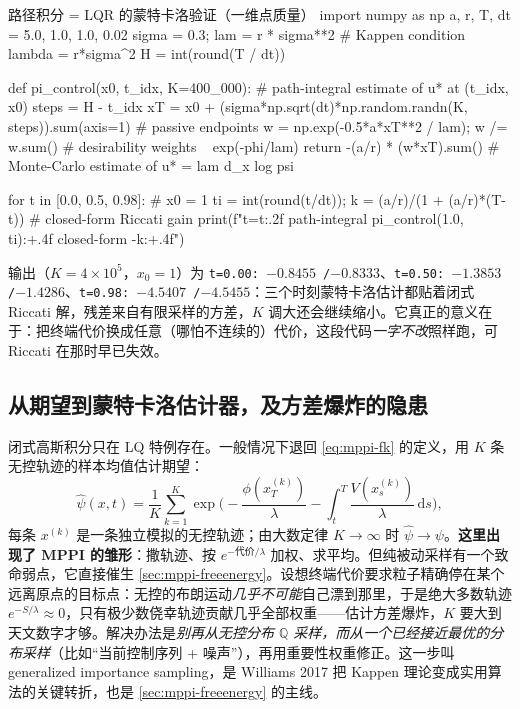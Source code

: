 \begin{codebox}[Python]{路径积分 = LQR 的蒙特卡洛验证（一维点质量）}
import numpy as np
a, r, T, dt = 5.0, 1.0, 1.0, 0.02
sigma = 0.3; lam = r * sigma**2              # Kappen condition  lambda = r*sigma^2
H = int(round(T / dt))

def pi_control(x0, t_idx, K=400_000):        # path-integral estimate of u* at (t_idx, x0)
    steps = H - t_idx
    xT = x0 + (sigma*np.sqrt(dt)*np.random.randn(K, steps)).sum(axis=1)  # passive endpoints
    w = np.exp(-0.5*a*xT**2 / lam); w /= w.sum()         # desirability weights  ~ exp(-phi/lam)
    return -(a/r) * (w*xT).sum()             # Monte-Carlo estimate of  u* = lam d_x log psi

for t in [0.0, 0.5, 0.98]:                   # x0 = 1
    ti = int(round(t/dt)); k = (a/r)/(1 + (a/r)*(T-t))   # closed-form Riccati gain
    print(f"t={t:.2f}  path-integral {pi_control(1.0, ti):+.4f}   closed-form {-k:+.4f}")
\end{codebox}

\noindent 输出（$K=4\times10^5$，$x_0=1$）为 \texttt{t=0.00: $-0.8455$ /\allowbreak  $-0.8333$}、\texttt{t=0.50: $-1.3853$ /\allowbreak  $-1.4286$}、\texttt{t=0.98: $-4.5407$ /\allowbreak  $-4.5455$}：三个时刻蒙特卡洛估计都贴着闭式 Riccati 解，残差来自有限采样的方差，$K$ 调大还会继续缩小。它真正的意义在于：把终端代价换成任意（哪怕不连续的）代价，这段代码\emph{一字不改}照样跑，可 Riccati 在那时早已失效。

\subsection{从期望到蒙特卡洛估计器，及方差爆炸的隐患}
\label{sec:mppi-mc}

闭式高斯积分只在 LQ 特例存在。一般情况下退回 \cref{eq:mppi-fk} 的定义，用 $K$ 条无控轨迹的样本均值估计期望：
\begin{equation}
  \hat\psi(x,t)=\frac{1}{K}\sum_{k=1}^{K}\exp\!\Big(-\frac{\phi(x_T^{(k)})}{\lambda}-\int_t^T\frac{V(x_s^{(k)})}{\lambda}\,\mathrm{d}s\Big),
  \label{eq:mppi-psihat}
\end{equation}
每条 $x^{(k)}$ 是一条独立模拟的无控轨迹；由大数定律 $K\to\infty$ 时 $\hat\psi\to\psi$。\textbf{这里出现了 MPPI 的雏形}：撒轨迹、按 $e^{-\text{代价}/\lambda}$ 加权、求平均。但纯被动采样有一个致命弱点，它直接催生 \cref{sec:mppi-freeenergy}。设想终端代价要求粒子精确停在某个远离原点的目标点：无控的布朗运动\emph{几乎不可能}自己漂到那里，于是绝大多数轨迹 $e^{-S/\lambda}\approx0$，只有极少数侥幸轨迹贡献几乎全部权重——估计方差爆炸，$K$ 要大到天文数字才够。解决办法是\emph{别再从无控分布 $\mathbb{Q}$ 采样，而从一个已经接近最优的分布采样}（比如“当前控制序列 + 噪声”），再用重要性权重修正。这一步叫 generalized importance sampling，是 Williams 2017 把 Kappen 理论变成实用算法的关键转折\cite{williams2017model}，也是 \cref{sec:mppi-freeenergy} 的主线。

